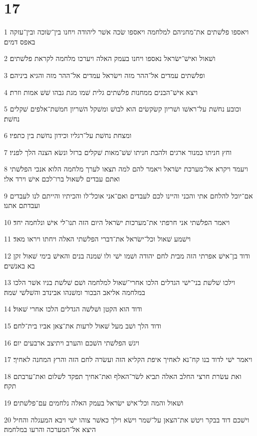 \chapter{17}

\par 1 ויאספו פלשׁתים את־מחניהם למלחמה ויאספו שׂכה אשׁר ליהודה ויחנו בין־שׂוכה ובין־עזקה באפס דמים׃
\par 2 ושׁאול ואישׁ־ישׂראל נאספו ויחנו בעמק האלה ויערכו מלחמה לקראת פלשׁתים׃
\par 3 ופלשׁתים עמדים אל־ההר מזה וישׂראל עמדים אל־ההר מזה והגיא ביניהם׃
\par 4 ויצא אישׁ־הבנים ממחנות פלשׁתים גלית שׁמו מגת גבהו שׁשׁ אמות וזרת׃
\par 5 וכובע נחשׁת על־ראשׁו ושׁריון קשׂקשׂים הוא לבושׁ ומשׁקל השׁריון חמשׁת־אלפים שׁקלים נחשׁת׃
\par 6 ומצחת נחשׁת על־רגליו וכידון נחשׁת בין כתפיו׃
\par 7 וחץ חניתו כמנור ארגים ולהבת חניתו שׁשׁ־מאות שׁקלים ברזל ונשׂא הצנה הלך לפניו׃
\par 8 ויעמד ויקרא אל־מערכת ישׂראל ויאמר להם למה תצאו לערך מלחמה הלוא אנכי הפלשׁתי ואתם עבדים לשׁאול ברו־לכם אישׁ וירד אלי׃
\par 9 אם־יוכל להלחם אתי והכני והיינו לכם לעבדים ואם־אני אוכל־לו והכיתיו והייתם לנו לעבדים ועבדתם אתנו׃
\par 10 ויאמר הפלשׁתי אני חרפתי את־מערכות ישׂראל היום הזה תנו־לי אישׁ ונלחמה יחד׃
\par 11 וישׁמע שׁאול וכל־ישׂראל את־דברי הפלשׁתי האלה ויחתו ויראו מאד׃
\par 12 ודוד בן־אישׁ אפרתי הזה מבית לחם יהודה ושׁמו ישׁי ולו שׁמנה בנים והאישׁ בימי שׁאול זקן בא באנשׁים׃
\par 13 וילכו שׁלשׁת בני־ישׁי הגדלים הלכו אחרי־שׁאול למלחמה ושׁם שׁלשׁת בניו אשׁר הלכו במלחמה אליאב הבכור ומשׁנהו אבינדב והשׁלשׁי שׁמה׃
\par 14 ודוד הוא הקטן ושׁלשׁה הגדלים הלכו אחרי שׁאול׃
\par 15 ודוד הלך ושׁב מעל שׁאול לרעות את־צאן אביו בית־לחם׃
\par 16 ויגשׁ הפלשׁתי השׁכם והערב ויתיצב ארבעים יום׃
\par 17 ויאמר ישׁי לדוד בנו קח־נא לאחיך איפת הקליא הזה ועשׂרה לחם הזה והרץ המחנה לאחיך׃
\par 18 ואת עשׂרת חרצי החלב האלה תביא לשׂר־האלף ואת־אחיך תפקד לשׁלום ואת־ערבתם תקח׃
\par 19 ושׁאול והמה וכל־אישׁ ישׂראל בעמק האלה נלחמים עם־פלשׁתים׃
\par 20 וישׁכם דוד בבקר ויטשׁ את־הצאן על־שׁמר וישׂא וילך כאשׁר צוהו ישׁי ויבא המעגלה והחיל היצא אל־המערכה והרעו במלחמה׃
